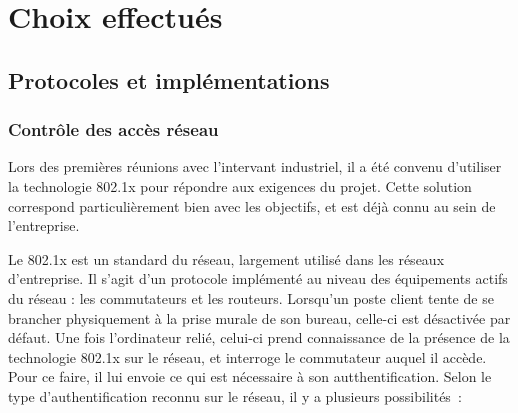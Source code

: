 \section{Choix effectués}
\subsection{Protocoles et implémentations}
\subsubsection{Contrôle des accès réseau}

Lors des premières réunions avec l'intervant industriel, il a été convenu d'utiliser la technologie 802.1x pour répondre aux exigences du projet. Cette solution correspond particulièrement bien avec les objectifs, et est déjà connu au sein de l'entreprise.

Le 802.1x est un standard du réseau, largement utilisé dans les réseaux d'entreprise. Il s'agit d'un protocole implémenté au niveau des équipements actifs du réseau : les commutateurs et les routeurs. Lorsqu'un poste client tente de se brancher physiquement à la prise murale de son bureau, celle-ci est désactivée par défaut. Une fois l'ordinateur relié, celui-ci prend connaissance de la présence de la technologie 802.1x sur le réseau, et interroge le commutateur auquel il accède. Pour ce faire, il lui envoie ce qui est nécessaire à son autthentification. Selon le type d'authentification reconnu sur le réseau, il y a plusieurs possibilités~:


